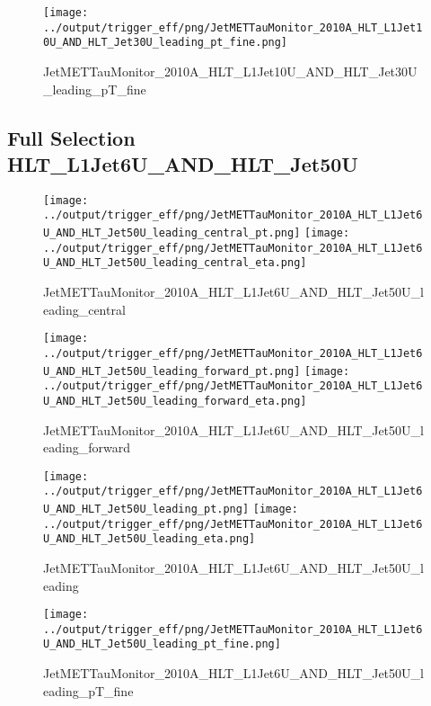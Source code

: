\documentclass[11pt]{article}
\begin{document}
\begin{figure}[ht]
\centering
\texttt{[image: ../output/trigger\_eff/png/JetMETTauMonitor\_2010A\_HLT\_L1Jet10U\_AND\_HLT\_Jet30U\_leading\_pt\_fine.png]}
\caption{JetMETTauMonitor\_2010A\_HLT\_L1Jet10U\_AND\_HLT\_Jet30U\_leading\_pT\_fine}
\label{fig:jetmettaumon_HLT_L1Jet10U_AND_HLT_Jet30U_leading_pT_fine}
\end{figure}
\clearpage


\newpage
\subsection{Full Selection HLT\_L1Jet6U\_AND\_HLT\_Jet50U}
\begin{figure}[ht]
\centering
\texttt{[image: ../output/trigger\_eff/png/JetMETTauMonitor\_2010A\_HLT\_L1Jet6U\_AND\_HLT\_Jet50U\_leading\_central\_pt.png]}
\texttt{[image: ../output/trigger\_eff/png/JetMETTauMonitor\_2010A\_HLT\_L1Jet6U\_AND\_HLT\_Jet50U\_leading\_central\_eta.png]}
\caption{JetMETTauMonitor\_2010A\_HLT\_L1Jet6U\_AND\_HLT\_Jet50U\_leading\_central}
\label{fig:jetmettaumon_HLT_L1Jet6U_AND_HLT_Jet50U_leading_central}
\end{figure}

\begin{figure}[ht]
\centering
\texttt{[image: ../output/trigger\_eff/png/JetMETTauMonitor\_2010A\_HLT\_L1Jet6U\_AND\_HLT\_Jet50U\_leading\_forward\_pt.png]}
\texttt{[image: ../output/trigger\_eff/png/JetMETTauMonitor\_2010A\_HLT\_L1Jet6U\_AND\_HLT\_Jet50U\_leading\_forward\_eta.png]}
\caption{JetMETTauMonitor\_2010A\_HLT\_L1Jet6U\_AND\_HLT\_Jet50U\_leading\_forward}
\label{fig:jetmettaumon_HLT_L1Jet6U_AND_HLT_Jet50U_leading_forward}
\end{figure}

\begin{figure}[ht]
\centering
\texttt{[image: ../output/trigger\_eff/png/JetMETTauMonitor\_2010A\_HLT\_L1Jet6U\_AND\_HLT\_Jet50U\_leading\_pt.png]}
\texttt{[image: ../output/trigger\_eff/png/JetMETTauMonitor\_2010A\_HLT\_L1Jet6U\_AND\_HLT\_Jet50U\_leading\_eta.png]}
\caption{JetMETTauMonitor\_2010A\_HLT\_L1Jet6U\_AND\_HLT\_Jet50U\_leading}
\label{fig:jetmettaumon_HLT_L1Jet6U_AND_HLT_Jet50U_leading}
\end{figure}

\begin{figure}[ht]
\centering
\texttt{[image: ../output/trigger\_eff/png/JetMETTauMonitor\_2010A\_HLT\_L1Jet6U\_AND\_HLT\_Jet50U\_leading\_pt\_fine.png]}
\caption{JetMETTauMonitor\_2010A\_HLT\_L1Jet6U\_AND\_HLT\_Jet50U\_leading\_pT\_fine}
\label{fig:jetmettaumon_HLT_L1Jet6U_AND_HLT_Jet50U_leading_pT_fine}
\end{figure}
\clearpage
\end{document}

